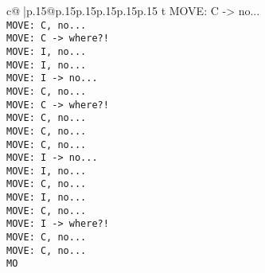 \documentclass{article}
\begin{document}
{\begin{supertabular}{c@{$\;$}|p{.15\linewidth}@{}p{.15\linewidth}p{.15\linewidth}p{.15\linewidth}p{.15\linewidth}p{.15\linewidth}}
{{{t  MOVE: C -> no...\\ \tt  MOVE: C, no...\\ \tt  MOVE: C -> where?!\\ \tt  MOVE: I, no...\\ \tt  MOVE: I, no...\\ \tt  MOVE: I -> no...\\ \tt  MOVE: C, no...\\ \tt  MOVE: C -> where?!\\ \tt  MOVE: C, no...\\ \tt  MOVE: C, no...\\ \tt  MOVE: C, no...\\ \tt  MOVE: I -> no...\\ \tt  MOVE: I, no...\\ \tt  MOVE: C, no...\\ \tt  MOVE: I, no...\\ \tt  MOVE: C, no...\\ \tt  MOVE: I -> where?!\\ \tt  MOVE: C, no...\\ \tt  MOVE: C, no...\\ \tt  MO}}}
\end{supertabular}}
\end{document}
